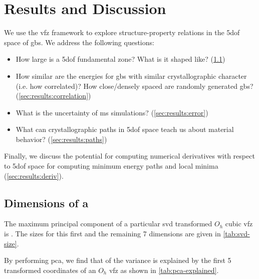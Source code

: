 \documentclass[final,twocolumn,12pt]{elsarticle}
\begin{document}
	\section{Results and Discussion} \label{sec:results}
	
	We use the \gls{vfz} framework to explore structure-property relations in the \gls{5dof} space of \glspl{gb}. We address the following questions:
	\begin{itemize}
		\item How large is a \gls{5dof} fundamental zone? What is it shaped like? (\cref{sec:results:dimensions})
		\item How similar are the energies for \glspl{gb} with similar crystallographic character (i.e. how correlated)? How close/densely spaced are randomly generated \glspl{gb}? (\cref{sec:results:correlation})
		\item What is the uncertainty of \gls{ms} simulations? (\cref{sec:results:error}) %
		\item What can crystallographic paths in \gls{5dof} space teach us about material behavior? (\cref{sec:results:paths})
	\end{itemize}
	
	Finally, we discuss the potential for computing numerical derivatives with respect to \gls{5dof} space for computing minimum energy paths and local minima (\cref{sec:results:deriv}).
	
	
	\subsection{Dimensions of a } \label{sec:results:dimensions}
	
	The maximum principal component of a particular \gls{svd} transformed $O_h$ cubic \gls{vfz} is \dimOne{}. The sizes for this first and the remaining 7 dimensions are given in \cref{tab:svd-size}.
	
	\begin{table}[!htb]
	    \centering
    	    \caption{Dimension of \gls{svd} transformed coordinates (Dimension) and \gls{gbo} dimension size ($\omega$) for a set of \num{50000} \glspl{vfzgbo}. These are the diagonal entries of the "S" matrix in the \gls{svd} decomposition. }
    	    \label{tab:svd-size}
	\end{table}
	By performing \gls{pca}, we find that \percExplained{} of the variance is explained by the first 5 transformed coordinates of an $O_h$ \gls{vfz} as shown in \cref{tab:pca-explained}.
	
\end{document}
